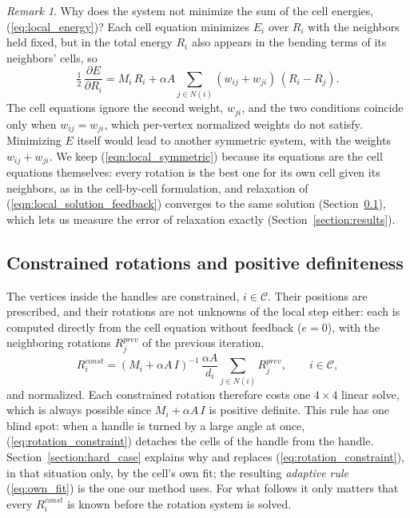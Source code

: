 \documentclass{birkjour}
\theoremstyle{remark}
\newtheorem{rem}[thm]{Remark}
\numberwithin{equation}{section}
\begin{document}
\begin{rem}
\label{rem:true_gradient}
Why does the system not minimize the sum of the cell energies, (\ref{eq:local_energy})? Each cell equation minimizes $E_i$ over $R_i$ with the neighbors held fixed, but in the total energy $R_i$ also appears in the bending terms of its neighbors' cells, so
\begin{equation}
\label{eq:true_gradient}
\tfrac{1}{2} \, \frac{\partial E}{\partial R_i} = M_i \, R_i + \alpha A \sum_{j \in N(i)} (w_{ij} + w_{ji}) \, (R_i - R_j).
\end{equation}
The cell equations ignore the second weight, $w_{ji}$, and the two conditions coincide only when $w_{ij} = w_{ji}$, which per-vertex normalized weights do not satisfy. Minimizing $E$ itself would lead to another symmetric system, with the weights $w_{ij} + w_{ji}$. We keep (\ref{eqn:local_symmetric}) because its equations are the cell equations themselves: every rotation is the best one for its own cell given its neighbors, as in the cell-by-cell formulation, and relaxation of (\ref{eqn:local_solution_feedback}) converges to the same solution (Section~\ref{section:rotation_constraints}), which lets us measure the error of relaxation exactly (Section~\ref{section:results}).
\end{rem}

\subsection{Constrained rotations and positive definiteness}
\label{section:rotation_constraints}

The vertices inside the handles are constrained, $i \in \mathcal C$. Their positions are prescribed, and their rotations are not unknowns of the local step either: each is computed directly from the cell equation without feedback ($e = 0$), with the neighboring rotations $R^{prev}_j$ of the previous iteration,
\begin{equation}
\label{eq:rotation_constraint}
R^{const}_i = (M_i + \alpha A \, I)^{-1} \, \frac{\alpha A}{d_i} \sum_{j \in N(i)} R^{prev}_j , \qquad i \in \mathcal C,
\end{equation}
and normalized. Each constrained rotation therefore costs one $4 \times 4$ linear solve, which is always possible since $M_i + \alpha A \, I$ is positive definite. This rule has one blind spot: when a handle is turned by a large angle at once, (\ref{eq:rotation_constraint}) detaches the cells of the handle from the handle. Section~\ref{section:hard_case} explains why and replaces (\ref{eq:rotation_constraint}), in that situation only, by the cell's own fit; the resulting \emph{adaptive rule} (\ref{eq:own_fit}) is the one our method uses. For what follows it only matters that every $R^{const}_i$ is known before the rotation system is solved.
\end{document}
